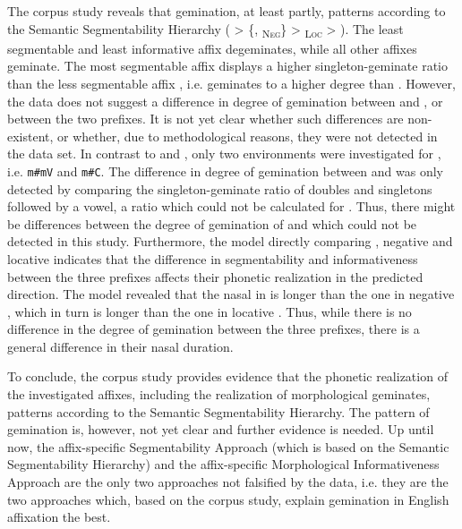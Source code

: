 The corpus study reveals that gemination, at least partly, patterns according to the Semantic Segmentability Hierarchy ( > \{, \textsubscript{\textsc{Neg}}\} >  \textsubscript{\textsc{Loc}} > ). %
The least segmentable and least informative affix  degeminates, while all other affixes geminate. The most segmentable affix  displays a higher singleton-geminate ratio than the less segmentable affix , i.e.  geminates to a higher degree than . However, the data does not suggest a difference in degree of gemination between  and , or between the two prefixes.
 It is not yet clear whether such differences are non-existent, or whether, due to methodological reasons, they were not detected in the data set. 
  In contrast to  and , only two environments were investigated for , i.e. \texttt{m\#mV} and \texttt{m\#C}. The difference in degree of gemination between  and  was only detected by comparing the singleton-geminate ratio of doubles and singletons followed by a vowel, a ratio which could not be calculated for . Thus, there might be differences between the degree of gemination of  and  which could not be detected in this study.
Furthermore, the model directly comparing , negative  and locative  indicates that the difference in segmentability and informativeness between the three prefixes affects their phonetic realization in the predicted direction. The model revealed that the nasal in  is longer than the one in negative , which in turn is longer than the one in locative . Thus, while there is no difference in the degree of gemination between the three prefixes, there is a general difference in  their nasal duration.
 
 To conclude, the corpus study provides evidence that the phonetic realization of the investigated affixes, including the realization of morphological geminates, patterns according to the Semantic Segmentability Hierarchy. The pattern of gemination is, however, not yet clear and further evidence is needed. 
 Up until now, the affix-specific Segmentability Approach (which is based on the Semantic Segmentability Hierarchy) and the affix-specific Morphological Informativeness Approach are the only two approaches not falsified by the data, i.e. they are the two approaches which, based on the corpus study, explain gemination in English affixation the best.


